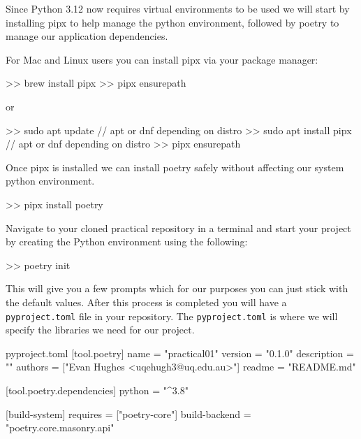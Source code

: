 \documentclass{csse4400}
\begin{document}
Since Python 3.12 now requires virtual environments to be used we will start by installing pipx to help manage the python environment, followed by poetry to manage our application dependencies.

For Mac and Linux users you can install pipx via your package manager:

\begin{code}[language=bash,numbers=none]{}
  >> brew install pipx
  >> pipx ensurepath
\end{code}

or 

\begin{code}[language=bash,numbers=none]{}
  >> sudo apt update // apt or dnf depending on distro
  >> sudo apt install pipx // apt or dnf depending on distro
  >> pipx ensurepath 
\end{code}

Once pipx is installed we can install poetry safely without affecting our system python environment.

\begin{code}[language=bash,numbers=none]{}
  >> pipx install poetry
\end{code}

Navigate to your cloned practical repository in a terminal and start your project by creating the Python environment using the following:

\begin{code}[language=bash,numbers=none]{}
  >> poetry init
\end{code}

This will give you a few prompts which for our purposes you can just stick with the default values.
After this process is completed you will have a \texttt{pyproject.toml} file in your repository.
The \texttt{pyproject.toml} is where we will specify the libraries we need for our project.

\begin{code}{pyproject.toml}
  [tool.poetry]
  name = "practical01"
  version = "0.1.0"
  description = ""
  authors = ["Evan Hughes <uqehugh3@uq.edu.au>"]
  readme = "README.md"
  
  [tool.poetry.dependencies]
  python = "^3.8"
  
  
  [build-system]
  requires = ["poetry-core"]
  build-backend = "poetry.core.masonry.api"
\end{code}

\end{document}
